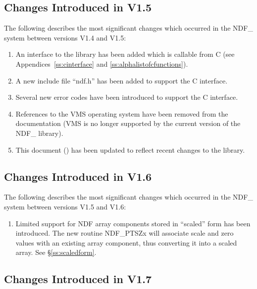 \subsection{Changes Introduced in V1.5}

The following describes the most significant changes which occurred in
the NDF\_ system between versions V1.4 and V1.5:

\begin{enumerate}
\item An interface to the library has been added which is callable
from C (see Appendices~\ref{ss:cinterface} and
\ref{ss:alphalistofcfunctions}).

\item A new include file ``ndf.h'' has been added to support the
C interface.

\item Several new error codes have been introduced to support the C
interface.

\item References to the VMS operating system have been removed from
the documentation (VMS is no longer supported by the current version
of the NDF\_ library).

\item This document () has been updated to
reflect recent changes to the library.
\end{enumerate}

\subsection{Changes Introduced in V1.6}

The following describes the most significant changes which occurred in
the NDF\_ system between versions V1.5 and V1.6:

\begin{enumerate}
\item Limited support for NDF array components stored in ``scaled'' form
has been introduced. The new routine NDF\_PTSZx will associate scale and
zero values with an existing array component, thus converting it into a
scaled array. See \S\ref{ss:scaledform}.

\end{enumerate}

\subsection{Changes Introduced in V1.7}

